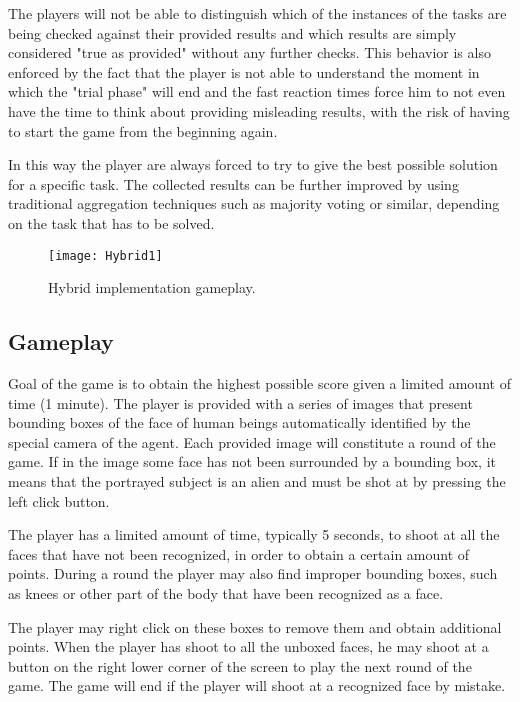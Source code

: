 The players will not be able to distinguish which of the instances of the tasks
are being checked against their provided results and which results are simply
considered "true as provided" without any further checks. This behavior is also
enforced by the fact that the player is not able to understand the moment in which
the "trial phase" will end and the fast reaction times force him to not even have
the time to think about providing misleading results, with the risk of having to
start the game from the beginning again.

In this way the player are always forced to try to give the best possible solution
for a specific task. The collected results can be further improved by using
traditional aggregation techniques such as majority voting or similar, depending
on the task that has to be solved.

\begin{figure}[htb]
    \centering
    \texttt{[image: Hybrid1]}
    \caption{Hybrid implementation gameplay.}
    \label{fig:Hybrid2}
\end{figure}

\subsection{Gameplay}\label{case:hybrid:gameplay}
Goal of the game is to obtain the highest possible score given a limited amount
of time (1 minute). The player is provided with a series of images that present
bounding boxes of the face of human beings automatically identified by the special
camera of the agent. Each provided image will constitute a round of the game. If
in the image some face has not been surrounded by a bounding box, it means that
the portrayed subject is an alien and must be shot at by pressing the left click
button.

The player has a limited amount of time, typically 5 seconds, to shoot at all the
faces that have not been recognized, in order to obtain a certain amount of points.
During a round the player may also find improper bounding boxes, such as knees or
other part of the body that have been recognized as a face.

The player may right click on these boxes to remove them and obtain additional
points. When the player has shoot to all the unboxed faces, he may shoot at a
button on the right lower corner of the screen to play the next round of the game.
The game will end if the player will shoot at a recognized face by mistake.

